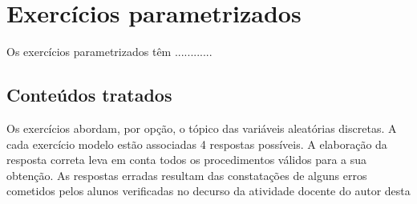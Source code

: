 \documentclass[Tese.tex]{subfiles}
\begin{document}
\chapter{Exercícios parametrizados}
 


Os exercícios parametrizados têm ............


\section {Conteúdos tratados}
\justify
Os exercícios abordam, por opção, o tópico das variáveis aleatórias discretas. A cada exercício modelo estão associadas 4 respostas possíveis. A elaboração da resposta correta leva em conta todos os procedimentos válidos para a sua obtenção. As respostas erradas resultam das constatações de alguns erros cometidos pelos alunos verificadas no decurso da atividade docente do autor desta 
\end{document}
